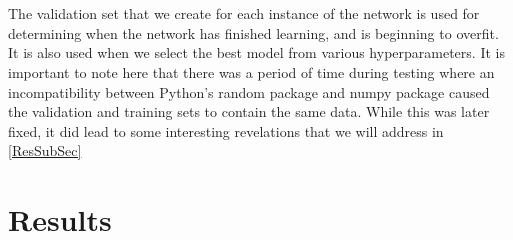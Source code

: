 \\\\ The validation set that we create for each instance of the network is used for determining when the network has finished learning, and is beginning to overfit. It is also used when we select the best model from various hyperparameters. It is important to note here that there was a period of time during testing where an incompatibility between Python's random package and numpy package caused the validation and training sets to contain the same data. While this was later fixed, it did lead to some interesting revelations that we will address in \ref{ResSubSec}

\section{Results}
